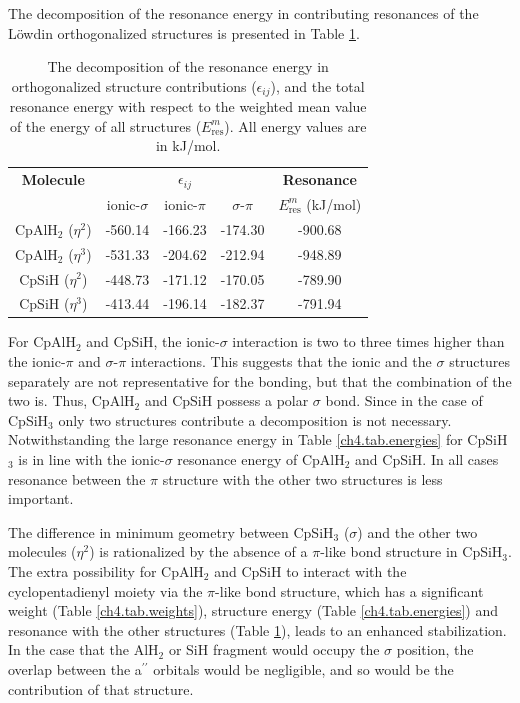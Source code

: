 The decomposition of the resonance energy in contributing resonances of the L\"{o}wdin orthogonalized structures \cite{havenith} is presented in Table \ref{ch4.tab.interactions}.
\begin{table}[htbp]
\caption{The decomposition of the resonance energy in orthogonalized structure contributions ($\epsilon_{ij}$), and the total resonance energy with respect to the weighted mean value of the energy of all structures ($E^m_\mathrm{res}$). All energy values are in kJ/mol.}
\center
\begin{tabular}{|c|ccc|c|}
\hline
\textbf{Molecule}&\multicolumn{3}{c|}{$\epsilon_{ij}$}&\textbf{Resonance}\\
&ionic-$\sigma$&ionic-$\pi$&$\sigma$-$\pi$&$E^m_\mathrm{res}$ (kJ/mol)\\
\hline
CpAlH$_2$ ($\eta^{2}$)& -560.14& -166.23& -174.30& -900.68\\
CpAlH$_2$ ($\eta^{3}$)& -531.33& -204.62& -212.94& -948.89\\
CpSiH ($\eta^{2}$)& -448.73& -171.12& -170.05& -789.90\\
CpSiH ($\eta^{3}$)& -413.44& -196.14& -182.37& -791.94\\

\hline
\end{tabular}
\label{ch4.tab.interactions}
\end{table}
For CpAlH$_2$ and CpSiH, the ionic-$\sigma$ interaction is two to three times higher than the ionic-$\pi$ and $\sigma$-$\pi$ interactions. This suggests that the ionic and the $\sigma$ structures separately are not representative for the bonding, but that the combination of the two is. Thus, CpAlH$_2$ and CpSiH possess a polar $\sigma$ bond. Since in the case of CpSiH$_3$ only two structures contribute a decomposition is not necessary. Notwithstanding the large resonance energy in Table \ref{ch4.tab.energies} for CpSiH$_3$ is in line with the ionic-$\sigma$ resonance energy of CpAlH$_2$ and CpSiH. In all cases resonance between the $\pi$ structure with the other two structures is less important.

The difference in minimum geometry between CpSiH$_3$ ($\sigma$) and the other two molecules ($\eta^2$) is rationalized by the absence of a $\pi$-like bond structure in CpSiH$_3$. The extra possibility for CpAlH$_2$ and CpSiH to interact with the cyclopentadienyl moiety via the $\pi$-like bond structure, which has a significant weight (Table \ref{ch4.tab.weights}), structure energy (Table \ref{ch4.tab.energies}) and resonance with the other structures (Table \ref{ch4.tab.interactions}), leads to an enhanced stabilization. In the case that the AlH$_2$ or SiH fragment would occupy the $\sigma$ position, the overlap between the a$^{\prime\prime}$ orbitals would be negligible, and so would be the contribution of that structure.  

